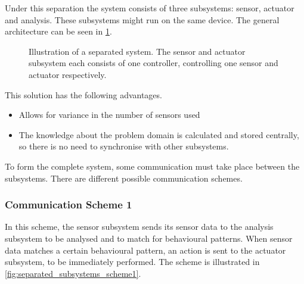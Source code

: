 Under this separation the system consists of three subsystems: sensor, actuator and analysis. These subsystems might run on the same device. The general architecture can be seen in \cref{fig:separated_subsystems}.

\begin{figure}[htbp]
\centering
{}
\caption[Separated system]{Illustration of a separated system. The sensor and actuator subsystem each consists of one controller, controlling one sensor and actuator respectively.}\label{fig:separated_subsystems}
\end{figure}

This solution has the following advantages.

\begin{itemize}
  \item Allows for variance in the number of sensors used
  \item The knowledge about the problem domain is calculated and stored centrally, so there is no need to synchronise with other subsystems.
\end{itemize}

To form the complete system, some communication must take place between the subsystems. There are different possible communication schemes.

\subsubsection{Communication Scheme 1}

In this scheme, the sensor subsystem sends its sensor data to the analysis subsystem to be analysed and to match for behavioural patterns. When sensor data matches a certain behavioural pattern, an action is sent to the actuator subsystem, to be immediately performed.  The scheme is illustrated in \cref{fig:separated_subsystems_scheme1}.

